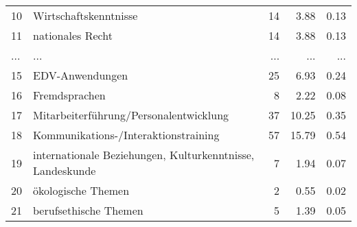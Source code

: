 \begin{longtable}{lXrrr}
        10 & \multicolumn{1}{X}{Wirtschaftskenntnisse} & %
          \num{14} &
          \num[round-mode=places,round-precision=2]{3,88} &
          \num[round-mode=places,round-precision=2]{0,13} \\
        11 & \multicolumn{1}{X}{nationales Recht} & %
          \num{14} &
          \num[round-mode=places,round-precision=2]{3,88} &
          \num[round-mode=places,round-precision=2]{0,13} \\
       ... & ... & ... & ... & ... \\
        15 & \multicolumn{1}{X}{EDV-Anwendungen} & %
          \num{25} &
          \num[round-mode=places,round-precision=2]{6,93} &
          \num[round-mode=places,round-precision=2]{0,24} \\

        16 & \multicolumn{1}{X}{Fremdsprachen} & %
          \num{8} &
          \num[round-mode=places,round-precision=2]{2,22} &
          \num[round-mode=places,round-precision=2]{0,08} \\

        17 & \multicolumn{1}{X}{Mitarbeiterführung/Personalentwicklung} & %
          \num{37} &
          \num[round-mode=places,round-precision=2]{10,25} &
          \num[round-mode=places,round-precision=2]{0,35} \\

        18 & \multicolumn{1}{X}{Kommunikations-/Interaktionstraining} & %
          \num{57} &
          \num[round-mode=places,round-precision=2]{15,79} &
          \num[round-mode=places,round-precision=2]{0,54} \\

        19 & \multicolumn{1}{X}{internationale Beziehungen, Kulturkenntnisse, Landeskunde} & %
          \num{7} &
          \num[round-mode=places,round-precision=2]{1,94} &
          \num[round-mode=places,round-precision=2]{0,07} \\

        20 & \multicolumn{1}{X}{ökologische Themen} & %
          \num{2} &
          \num[round-mode=places,round-precision=2]{0,55} &
          \num[round-mode=places,round-precision=2]{0,02} \\

        21 & \multicolumn{1}{X}{berufsethische Themen} & %
          \num{5} &
          \num[round-mode=places,round-precision=2]{1,39} &
          \num[round-mode=places,round-precision=2]{0,05} \\


\end{longtable}
